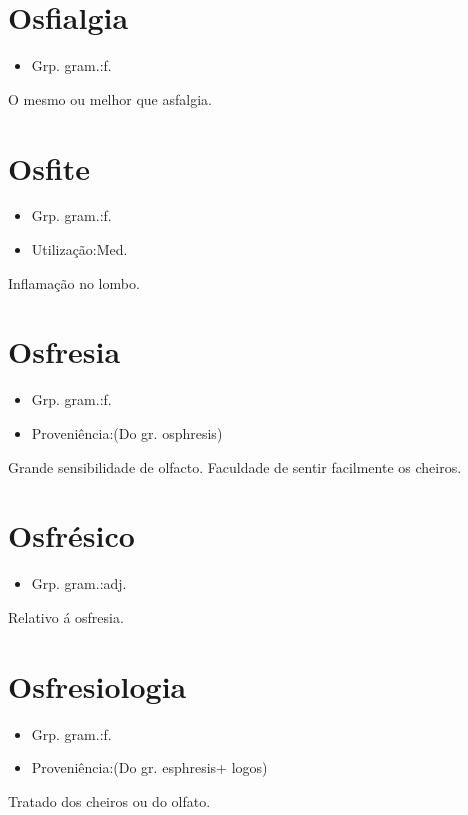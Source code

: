 \section{Osfialgia}
\begin{itemize}
\item {Grp. gram.:f.}
\end{itemize}
O mesmo ou melhor que \textunderscore asfalgia\textunderscore .
\section{Osfite}
\begin{itemize}
\item {Grp. gram.:f.}
\end{itemize}
\begin{itemize}
\item {Utilização:Med.}
\end{itemize}
Inflamação no lombo.
\section{Osfresia}
\begin{itemize}
\item {Grp. gram.:f.}
\end{itemize}
\begin{itemize}
\item {Proveniência:(Do gr. \textunderscore osphresis\textunderscore )}
\end{itemize}
Grande sensibilidade de olfacto.
Faculdade de sentir facilmente os cheiros.
\section{Osfrésico}
\begin{itemize}
\item {Grp. gram.:adj.}
\end{itemize}
Relativo á osfresia.
\section{Osfresiologia}
\begin{itemize}
\item {Grp. gram.:f.}
\end{itemize}
\begin{itemize}
\item {Proveniência:(Do gr. \textunderscore esphresis\textunderscore  + \textunderscore logos\textunderscore )}
\end{itemize}
Tratado dos cheiros ou do olfato.
